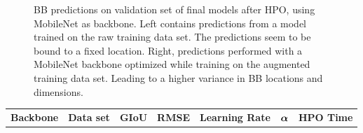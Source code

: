 \begin{figure}[!ht]
\begin{minipage}{.45\textwidth}
    \end{minipage}
    \caption{BB predictions on validation set of final models after HPO, using MobileNet as backbone. Left contains predictions from a model trained on the raw training data set. The predictions seem to be bound to a fixed location. Right, predictions performed with a MobileNet backbone optimized while training on the augmented training data set. Leading to a higher variance in BB locations and dimensions.}
    \label{fig:regression-samples-mobilenet}
\end{figure}

\begin{landscape}
\begin{table}[!ht]
    \centering
    \begin{tabular}{|l|l|c|c|c|c|c|}
    \hline
         \textbf{Backbone} & \textbf{Data set} & \textbf{GIoU} & \textbf{RMSE} & \textbf{Learning Rate} & $\bm{\alpha}$
         & \textbf{HPO Time}\\


\end{tabular}
\end{table}
\end{landscape}

